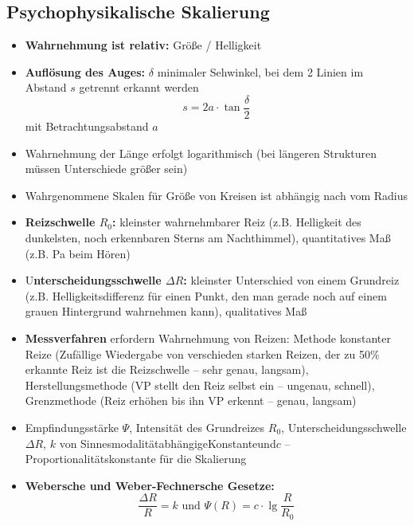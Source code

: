 \documentclass[12pt,landscape]{article}
\begin{document}
\begin{multicols}{3}
\subsection{Psychophysikalische Skalierung}
\begin{itemize}
\item \textbf{Wahrnehmung ist relativ:} Größe / Helligkeit 
\item \textbf{Auflösung des Auges:} $\delta$ minimaler Sehwinkel, bei dem 2 Linien im Abstand $s$ getrennt erkannt werden\[s = 2a \cdot \tan{\frac{\delta}{2}}\] mit Betrachtungsabstand $a$
\item Wahrnehmung der Länge erfolgt logarithmisch (bei längeren Strukturen müssen Unterschiede größer sein)
\item Wahrgenommene Skalen für Größe von Kreisen ist abhängig nach vom Radius
\item \textbf{Reizschwelle $R_0$:} kleinster wahrnehmbarer Reiz (z.B. Helligkeit des dunkelsten, noch erkennbaren Sterns am Nachthimmel), quantitatives Maß (z.B. Pa beim Hören) 
\item U\textbf{nterscheidungsschwelle $\Delta R$:} kleinster Unterschied von einem Grundreiz (z.B. Helligkeitsdifferenz für einen Punkt, den man gerade noch auf einem grauen Hintergrund wahrnehmen kann), qualitatives Maß 
\item \textbf{Messverfahren} erfordern Wahrnehmung von Reizen: Methode konstanter Reize (Zufällige Wiedergabe von verschieden starken Reizen, der zu 50\% erkannte Reiz ist die Reizschwelle -- sehr genau, langsam), Herstellungsmethode (VP stellt den Reiz selbst ein -- ungenau, schnell), Grenzmethode (Reiz erhöhen bis ihn VP erkennt -- genau, langsam)
\item Empfindungsstärke $\Psi$, Intensität des Grundreizes $R_0$, Unterscheidungsschwelle $\Delta R$, $k$ von Sinnesmodalität\hfill abhängige\hfill Konstante\hfill und\newline $c$ -- Proportionalitätskonstante für die Skalierung
\item \textbf{Webersche und Weber-Fechnersche Gesetze:}\\
\[\frac{\Delta R}{R} = k \text{ und }\Psi(R) = c \cdot \lg{\frac{R}{R_0}}\]


\end{itemize}
\end{multicols}
\end{document}
